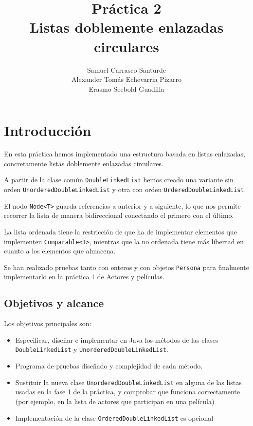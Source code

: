 \documentclass[a4paper,11pt]{report}
\title{Práctica 2\\Listas doblemente enlazadas circulares}
\author{Samuel Carrasco Santurde\\Alexander Tomás Echevarria Pizarro\\Erasmo Seebold Guadilla}
\date{}
\begin{document}
\maketitle
\tableofcontents
\listoftables

\chapter{Introducción}

En esta práctica hemos implementado una estructura basada en listas enlazadas, concretamente listas doblemente enlazadas circulares.

A partir de la clase común \texttt{DoubleLinkedList} hemos creado una variante sin orden \texttt{UnorderedDoubleLinkedList} y otra con orden \texttt{OrderedDoubleLinkedList}.

El nodo \texttt{Node<T>} guarda referencias a anterior y a siguiente, lo que nos permite recorrer la lista de manera bidireccional conectando el primero con el último.

La lista ordenada tiene la restricción de que ha de implementar elementos que implementen \texttt{Comparable<T>}, mientras que la no ordenada tiene más libertad en cuanto a los elementos que almacena.

Se han realizado pruebas tanto con enteros y con objetos \texttt{Persona} para finalmente implementarlo en la práctica 1 de Actores y películas.


\section{Objetivos y alcance}

Los objetivos principales son:
\begin{itemize}
    \item Especificar, diseñar e implementar en Java los métodos de las clases \texttt{DoubleLinkedList} y \texttt{UnorderedDoubleLinkedList}.
    \item Programa de pruebas diseñado y complejidad de cada método.
    \item Sustituir la nueva clase \texttt{UnorderedDoubleLinkedList} en alguna de las listas usadas en la fase 1 de la práctica, y comprobar que funciona correctamente (por ejemplo, en la lista de actores que participan en una película)
    \item Implementación de la clase \texttt{OrderedDoubleLinkedList} es opcional
\end{itemize}
\end{document}
